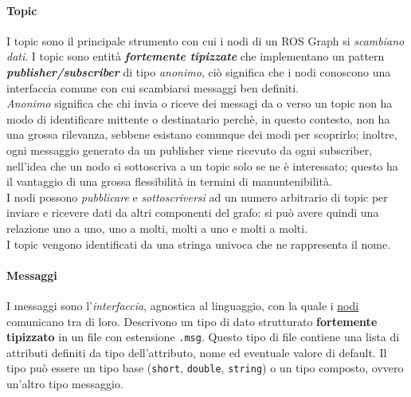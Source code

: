 \paragraph{Topic}
\label{ros:topics}
I topic sono il principale strumento con cui i nodi di un ROS Graph si \textit{scambiano dati}.
I topic sono entità \textbf{\textit{fortemente tipizzate}} che implementano
un pattern \textbf{\textit{publisher/subscriber}} di tipo \textit{anonimo}, ciò significa
che i nodi conoscono una interfaccia comune con cui scambiarsi messaggi ben definiti.\\
\textit{Anonimo} significa che chi invia o riceve dei messagi da o verso un topic
non ha modo di identificare mittente o destinatario perchè, in questo contesto, non ha una grossa rilevanza,
sebbene esistano comunque dei modi per scoprirlo; inoltre, ogni messaggio generato da un publisher
viene ricevuto da ogni subscriber, nell'idea che un nodo si sottoscriva a un topic solo se ne è
interessato; questo ha il vantaggio di una grossa flessibilità in termini di manuntenibilità.\\
I nodi possono \textit{pubblicare} e \textit{sottoscriversi} ad un numero arbitrario di topic
per inviare e ricevere dati da altri componenti del grafo: si può avere quindi una relazione uno a
uno, uno a molti, molti a uno e molti a molti.\\
I topic vengono identificati da una stringa univoca che ne rappresenta il nome.

\paragraph{Messaggi}
\label{ros:msgs}
I messaggi sono l'\textit{interfaccia}, agnostica al linguaggio, con la quale i \hyperref[ros:nodes]{nodi}
comunicano tra di loro. Descrivono un tipo di dato strutturato \textbf{fortemente tipizzato} in un
file con estensione \verb|.msg|. Questo tipo di file contiene una lista di attributi definiti da
tipo dell'attributo, nome ed eventuale valore di default. Il tipo può essere un tipo base
(\verb|short|, \verb|double|, \verb|string|) o un tipo composto, ovvero un'altro tipo messaggio.

